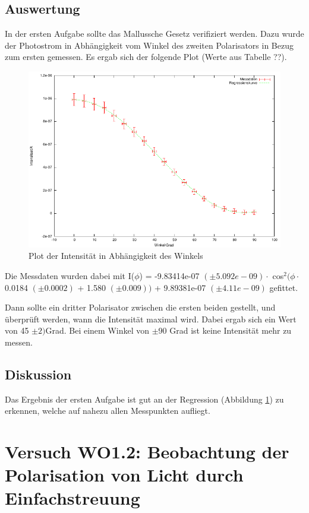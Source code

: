 \documentclass[12pt]{scrartcl}
\begin{document}
\subsection{Auswertung}
In der ersten Aufgabe sollte das Mallussche Gesetz verifiziert werden. Dazu wurde der Photostrom in Abhängigkeit vom Winkel des zweiten Polarisators in Bezug zum ersten gemessen. Es ergab sich der folgende Plot (Werte aus Tabelle ??).

\begin{figure}[H]
\centering
    \includegraphics[scale = 1]{a_1.pdf}
  	\caption[Plot der Intensität in Abhängigkeit des Winkels]{Plot der Intensität in Abhängigkeit des Winkels}
  \label{fig:a_1}
\end{figure}

Die Messdaten wurden dabei mit I($\phi$) = -9.83414e-07 $(\pm 5.092e-09) \cdot$ cos$^2(\phi \cdot$ 0.0184 $(\pm 0.0002)$ + 1.580 $(\pm 0.009) )$ + 9.89381e-07 $(\pm 4.11e-09)$ gefittet.   

Dann sollte ein dritter Polarisator zwischen die ersten beiden gestellt, und überprüft werden, wann die Intensität maximal wird. Dabei ergab sich ein Wert von 45 $\pm 2)$Grad. Bei einem Winkel von $\pm$90 Grad ist keine Intensität mehr zu messen.
\subsection{Diskussion}
Das Ergebnis der ersten Aufgabe ist gut an der Regression (Abbildung \ref{fig:a_1}) zu erkennen, welche auf nahezu allen Messpunkten aufliegt.


\section{Versuch WO1.2: Beobachtung der Polarisation von Licht durch Einfachstreuung}
\end{document}
